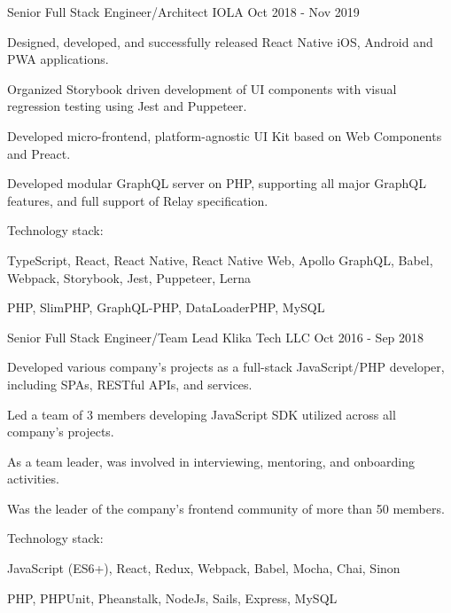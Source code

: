 \begin{cventries}
  \cventry
    {Senior Full Stack Engineer/Architect} %
    {IOLA} %
    {} %
    {Oct 2018 - Nov 2019} %
    {
      \begin{cvitems}
        \item Designed, developed, and successfully released React Native iOS, Android and PWA applications.
        \item Organized Storybook driven development of UI components with visual regression testing using Jest and Puppeteer.
        \item Developed micro-frontend, platform-agnostic UI Kit based on Web Components and Preact.
        \item Developed modular GraphQL server on PHP, supporting all major GraphQL features, and full support of Relay specification.
      \end{cvitems}
      \vspace{5mm}
      Technology stack:
      \begin{cvstackitems}
        \item TypeScript, React, React Native, React Native Web, Apollo GraphQL, Babel, Webpack, Storybook, Jest, Puppeteer, Lerna
        \item PHP, SlimPHP, GraphQL-PHP, DataLoaderPHP, MySQL
      \end{cvstackitems}
      \vspace{-2.0mm}
    }

  \cventry
    {Senior Full Stack Engineer/Team Lead} %
    {Klika Tech LLC} %
    {} %
    {Oct 2016 - Sep 2018} %
    {
      \begin{cvitems}
        \item Developed various company's projects as a full-stack JavaScript/PHP developer, including SPAs, RESTful APIs, and services.
        \item Led a team of 3 members developing JavaScript SDK utilized across all company's projects.
        \item As a team leader, was involved in interviewing, mentoring, and onboarding activities.
        \item Was the leader of the company's frontend community of more than 50 members.
      \end{cvitems}
      \vspace{5mm}
      Technology stack:
      \begin{cvstackitems}
        \item JavaScript (ES6+), React, Redux, Webpack, Babel, Mocha, Chai, Sinon
        \item PHP, PHPUnit, Pheanstalk, NodeJs, Sails, Express, MySQL
      \end{cvstackitems}
      \vspace{-2.0mm}
    }


\end{cventries}

